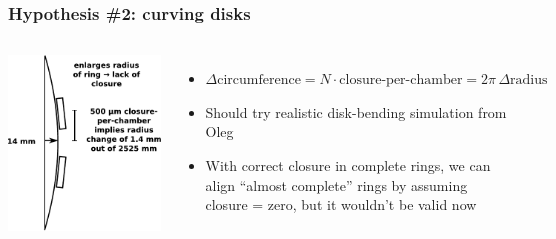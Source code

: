 \documentclass[compress]{beamer}
\begin{document}
\begin{frame}
\frametitle{Hypothesis \#2: curving disks}

\begin{columns}
\includegraphics[width=\linewidth]{bowing.pdf}


\vspace{2 cm}
\begin{itemize}
\item $\Delta \mbox{circumference} = N \cdot \mbox{closure-per-chamber} = 2\pi \, \Delta \mbox{radius}$

\item Should try realistic disk-bending simulation from Oleg

\item With correct closure in complete rings, we can align ``almost
  complete'' rings by assuming closure = zero, but it wouldn't be valid now

\end{itemize}
\end{columns}
\end{frame}
\end{document}
